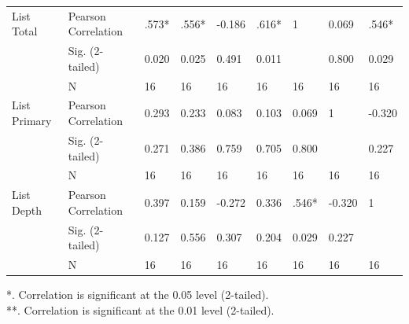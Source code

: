 \begin{landscape}
\begin{table}[hbtp!]
\begin{tabular}{|l|l|lllllll|}
List Total          & Pearson Correlation & .573*               & .556*     & -0.186      & .616*     & 1          & 0.069        & .546*      \\
                    & Sig. (2-tailed)     & 0.020               & 0.025     & 0.491       & 0.011     &            & 0.800        & 0.029      \\
                    & N                   & 16                  & 16        & 16          & 16        & 16         & 16           & 16         \\
List Primary        & Pearson Correlation & 0.293               & 0.233     & 0.083       & 0.103     & 0.069      & 1            & -0.320     \\
                    & Sig. (2-tailed)     & 0.271               & 0.386     & 0.759       & 0.705     & 0.800      &              & 0.227      \\
                    & N                   & 16                  & 16        & 16          & 16        & 16         & 16           & 16         \\
List Depth          & Pearson Correlation & 0.397               & 0.159     & -0.272      & 0.336     & .546*      & -0.320       & 1          \\
                    & Sig. (2-tailed)     & 0.127               & 0.556     & 0.307       & 0.204     & 0.029      & 0.227        &            \\
                    & N                   & 16                  & 16        & 16          & 16        & 16         & 16           & 16 \\\hline 
\end{tabular}
\end{table}
*. Correlation is significant at the 0.05 level (2-tailed). \\	
**. Correlation is significant at the 0.01 level (2-tailed).	

\end{landscape}
